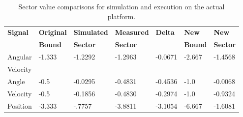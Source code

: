 \begin{table}[thpb]
\centering

\begin{tabular}[width=0.95\columnwidth]{ | l | l | l | l | l | l | l | }

\hline
\textbf{Signal} & \textbf{Original} & \textbf{Simulated} & \textbf{Measured} & \textbf{Delta} & \textbf{New} & \textbf{New} \\
                & \textbf{Bound}    & \textbf{Sector}    & \textbf{Sector}  &                & \textbf{Bound} & \textbf{Sector} \\
\hline \hline
Angular  & -1.333 & -1.2292 & -1.2963 & -0.0671 & -2.667 & -1.4568 \\
Velocity & & & & & & \\
\hline
Angle & -0.5 & -0.0295 & -0.4831 & -0.4536 & -1.0 & -0.0068 \\
\hline
Velocity & -0.5 & -0.1856 & -0.4830 & -0.2974 & -1.0 &  -0.9324 \\
\hline
Position & -3.333 & -.7757 & -3.8811 & -3.1054 & -6.667 & -1.6081 \\
\hline
\end{tabular}
\caption{Sector value comparisons for simulation and execution on the actual platform.}
\label{tab:sectors}
\end{table}




